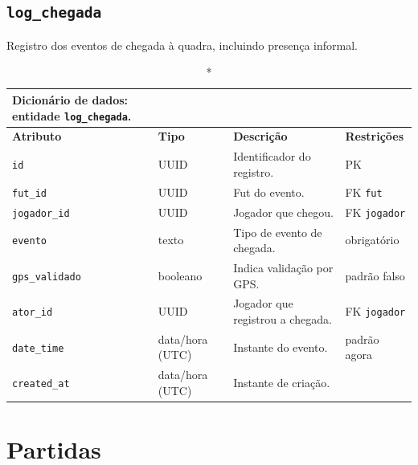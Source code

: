 \begin{apendicesenv}
    \subsection*{\texttt{log\_chegada}}
    Registro dos eventos de chegada à quadra, incluindo presença informal.
    \begin{longtable}{p{2.5cm}p{2.1cm}p{5.8cm}p{2.9cm}}
    \caption*{Dicionário de dados: entidade \texttt{log\_chegada}.}\\
        \hline
        \textbf{Atributo} & \textbf{Tipo} & \textbf{Descrição} & \textbf{Restrições} \\
        \hline
        \endhead
        \texttt{id} & UUID & Identificador do registro. & PK \\
        \texttt{fut\_id} & UUID & Fut do evento. & FK \texttt{fut} \\
        \texttt{jogador\_id} & UUID & Jogador que chegou. & FK \texttt{jogador} \\
        \texttt{evento} & texto & Tipo de evento de chegada. & obrigatório \\
        \texttt{gps\_validado} & booleano & Indica validação por GPS. & padrão falso \\
        \texttt{ator\_id} & UUID & Jogador que registrou a chegada. & FK \texttt{jogador} \\
        \texttt{date\_time} & data/hora (UTC) & Instante do evento. & padrão agora \\
        \texttt{created\_at} & data/hora (UTC) & Instante de criação. & \\
        \hline
    \end{longtable}

    \section*{Partidas}


\end{apendicesenv}
